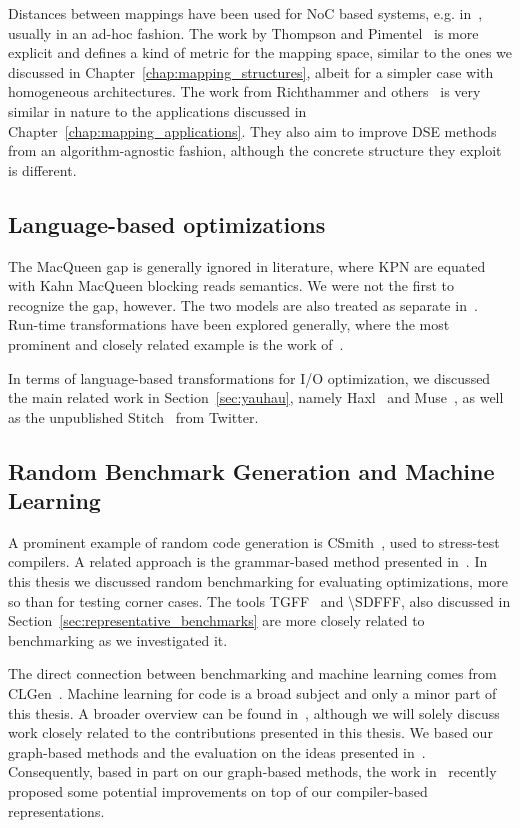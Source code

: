 Distances between mappings have been used for \ac{NoC} based systems, e.g. in~\cite{singh2010communication,weichslgartner2014daarm}, usually in an ad-hoc fashion.
The work by Thompson and Pimentel~\cite{thompson2013exploiting} is more explicit and defines a kind of metric for the mapping space, similar to the ones we discussed in Chapter~\ref{chap:mapping_structures}, albeit for a simpler case with homogeneous architectures.
The work from Richthammer and others~\cite{richthammer2018search,richthammer_todaes20} is very similar in nature to the applications discussed in Chapter~\ref{chap:mapping_applications}.
They also aim to improve \ac{DSE} methods from an algorithm-agnostic fashion, although the concrete structure they exploit is different.

\subsection{Language-based optimizations} 
The MacQueen gap is generally ignored in literature, where \ac{KPN} are equated with Kahn MacQueen blocking reads semantics. 
We were not the first to recognize the gap, however.
The two models are also treated as separate in~\cite{lee_matsikoudis_semantics}.
Run-time transformations have been explored generally, where the most prominent and closely related example is the work of~\cite{schor2014adapnet}.

In terms of language-based transformations for \ac{I/O} optimization, we discussed the main related work in Section~\ref{sec:yauhau}, namely Haxl~\cite{marlow2014haxl} and Muse~\cite{muse},
as well as the unpublished Stitch~\cite{stitch} from Twitter.

\subsection{Random Benchmark Generation and Machine Learning}
A prominent example of random code generation is CSmith~\cite{csmith}, used to stress-test compilers.
A related approach is the grammar-based method presented in~\cite{mckenzie1997generating}.
In this thesis we discussed random benchmarking for evaluating optimizations, more so than for testing corner cases.
The tools \ac{TGFF}~\cite{dick1998tgff} and \ac{\SDFFF}\cite{sdf3}, also discussed in Section~\ref{sec:representative_benchmarks} are more closely related to benchmarking as we investigated it.

The direct connection between benchmarking and machine learning comes from CLGen~\cite{cummins_cgo2017}.
Machine learning for code is a broad subject and only a minor part of this thesis.
A broader overview can be found in~\cite{allamanis2018survey}, although we will solely discuss work closely related to the contributions presented in this thesis. 
We based our graph-based methods and the evaluation on the ideas presented in~\cite{cummins_pact17,inst2vec}.
Consequently, based in part on our graph-based methods, the work in~\cite{cummins_programl,ye2020deep} recently proposed some potential improvements on top of our compiler-based representations.